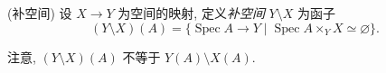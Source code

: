 \documentclass{book}
\begin{document}
	
	
	\begin{definition}
		[label={complement}]
		{(补空间)}
		设 $X\to Y$ 为空间的映射, 定义\emph{补空间} $Y\setminus X$ 为函子
		$$
		(Y\setminus X)(A) = \{\operatorname{Spec} A\to Y\mid \operatorname{Spec} A\times_Y X\simeq\varnothing\}.
		$$
	\end{definition}
	
	注意, $(Y\setminus X)(A)$ 不等于 $Y(A) \setminus X(A)$.
	
\end{document}
